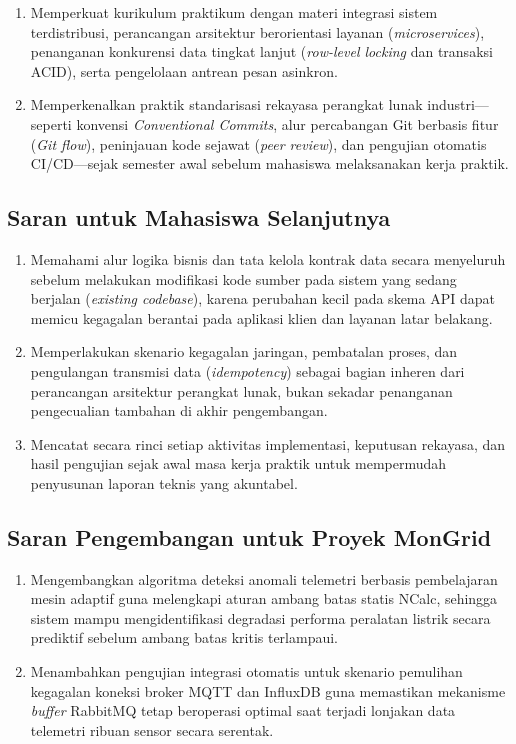 \begin{enumerate}[label=\arabic*., leftmargin=*, itemsep=0pt]
  \item Memperkuat kurikulum praktikum dengan materi integrasi sistem terdistribusi, perancangan arsitektur berorientasi layanan (\textit{microservices}), penanganan konkurensi data tingkat lanjut (\textit{row-level locking} dan transaksi ACID), serta pengelolaan antrean pesan asinkron.
  \item Memperkenalkan praktik standarisasi rekayasa perangkat lunak industri—seperti konvensi \textit{Conventional Commits}, alur percabangan Git berbasis fitur (\textit{Git flow}), peninjauan kode sejawat (\textit{peer review}), dan pengujian otomatis CI/CD—sejak semester awal sebelum mahasiswa melaksanakan kerja praktik.
\end{enumerate}

\subsection{Saran untuk Mahasiswa Selanjutnya}

\begin{enumerate}[label=\arabic*., leftmargin=*, itemsep=0pt]
  \item Memahami alur logika bisnis dan tata kelola kontrak data secara menyeluruh sebelum melakukan modifikasi kode sumber pada sistem yang sedang berjalan (\textit{existing codebase}), karena perubahan kecil pada skema API dapat memicu kegagalan berantai pada aplikasi klien dan layanan latar belakang.
  \item Memperlakukan skenario kegagalan jaringan, pembatalan proses, dan pengulangan transmisi data (\textit{idempotency}) sebagai bagian inheren dari perancangan arsitektur perangkat lunak, bukan sekadar penanganan pengecualian tambahan di akhir pengembangan.
  \item Mencatat secara rinci setiap aktivitas implementasi, keputusan rekayasa, dan hasil pengujian sejak awal masa kerja praktik untuk mempermudah penyusunan laporan teknis yang akuntabel.
\end{enumerate}

\subsection{Saran Pengembangan untuk Proyek MonGrid}

\begin{enumerate}[label=\arabic*., leftmargin=*, itemsep=0pt]
  \item Mengembangkan algoritma deteksi anomali telemetri berbasis pembelajaran mesin adaptif guna melengkapi aturan ambang batas statis NCalc, sehingga sistem mampu mengidentifikasi degradasi performa peralatan listrik secara prediktif sebelum ambang batas kritis terlampaui.
  \item Menambahkan pengujian integrasi otomatis untuk skenario pemulihan kegagalan koneksi broker MQTT dan InfluxDB guna memastikan mekanisme \textit{buffer} RabbitMQ tetap beroperasi optimal saat terjadi lonjakan data telemetri ribuan sensor secara serentak.
\end{enumerate}

